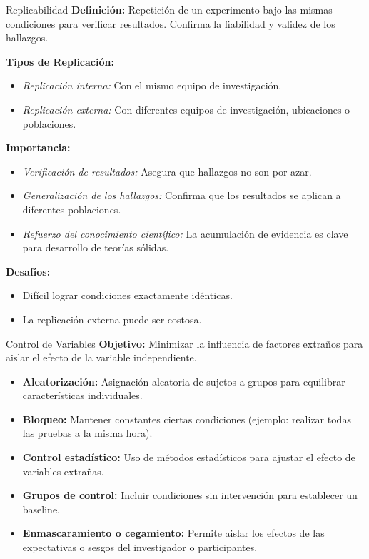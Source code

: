 ﻿\documentclass{beamer}
\begin{document}
\begin{frame}{Replicabilidad}
\textbf{Definición:} Repetición de un experimento bajo las mismas condiciones para verificar resultados. Confirma la fiabilidad y validez de los hallazgos.

\textbf{Tipos de Replicación:}
\begin{itemize}
    \item \textit{Replicación interna:} Con el mismo equipo de investigación.
    \item \textit{Replicación externa:} Con diferentes equipos de investigación, ubicaciones o poblaciones.
\end{itemize}

\textbf{Importancia:}
\begin{itemize}
    \item \textit{Verificación de resultados:} Asegura que hallazgos no son por azar.
    \item \textit{Generalización de los hallazgos:} Confirma que los resultados se aplican a diferentes  poblaciones.
    \item \textit{Refuerzo del conocimiento científico:} La acumulación de evidencia es clave para  desarrollo de teorías sólidas.
\end{itemize}

\textbf{Desafíos:}
\begin{itemize}
    \item Difícil lograr condiciones exactamente idénticas.
    \item La replicación externa puede ser costosa.
\end{itemize}
\end{frame}

\begin{frame}{Control de Variables}
\textbf{Objetivo:} Minimizar la influencia de factores extraños para aislar el efecto de la variable independiente.
\begin{itemize}
    \item \textbf{Aleatorización:} Asignación aleatoria de sujetos a grupos para equilibrar características individuales.
    \item \textbf{Bloqueo:} Mantener constantes ciertas condiciones (ejemplo: realizar todas las pruebas a la misma hora).
    \item \textbf{Control estadístico:} Uso de métodos estadísticos para ajustar el efecto de variables extrañas.
    \item \textbf{Grupos de control:} Incluir condiciones sin intervención para establecer un baseline.
    \item \textbf{Enmascaramiento o cegamiento:} Permite aislar los efectos de las expectativas o sesgos del investigador o participantes.
\end{itemize}
\end{frame}
\end{document}
